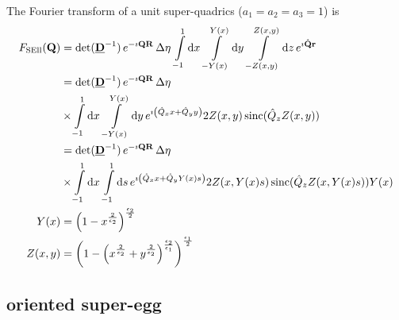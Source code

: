 The Fourier transform of a unit super-quadrics ($a_1=a_2=a_3=1$) is
\begin{align}\label{eq:FTsuperellipsoid}
  F_\mathrm{SEll}(\B{Q}) &=
\det(\M{D}^{-1})\, e^{-\imath\B{QR}}\, \Delta\eta\, \int\limits_{-1}^1
\mathrm{d}x\, \int\limits_{-Y(x)}^{Y(x)} \mathrm{d}y\,  \int\limits_{-Z(x,y)}^{Z(x,y)} \mathrm{d}z \,
e^{\imath\B{\hat{Q}r}} \nonumber \\
 &=
\det(\M{D}^{-1})\, e^{-\imath\B{QR}}\, \Delta\eta\,   \\
& \times \int\limits_{-1}^1
\mathrm{d}x\, \int\limits_{-Y(x)}^{Y(x)} \mathrm{d}y\,
e^{\imath\left(\hat{Q}_xx+\hat{Q}_yy\right)} 2Z(x,y)\operatorname{sinc}(\hat{Q}_z Z(x,y))\nonumber \\
&= \det(\M{D}^{-1})\, e^{-\imath\B{QR}}\, \Delta\eta\, \\
& \times \int\limits_{-1}^1
\mathrm{d}x\, \int\limits_{-1}^{1} \mathrm{d}s\,
e^{\imath\left(\hat{Q}_xx+\hat{Q}_yY(x)s\right)} 2Z(x,Y(x)s)\operatorname{sinc}(\hat{Q}_z Z(x,Y(x)s))Y(x)\nonumber \\
Y(x) &= \left(1-x^{\frac{2}{\epsilon_2}}\right)^{\frac{\epsilon_2}{2}}\\
Z(x,y) &= \left(1-\left(x^{\frac{2}{\epsilon_2}}+y^{\frac{2}{\epsilon_2}}\right)^{\frac{\epsilon_2}{\epsilon_1}}\right)^{\frac{\epsilon_1}{2}}
\end{align}



\clearpage
\subsection{oriented super-egg} ~\\

